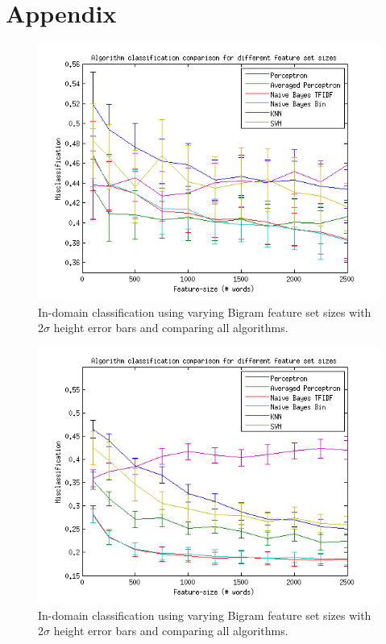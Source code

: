 \chapter{Appendix}
\begin{figure}[H]
\centering
\includegraphics[scale = 0.2]{../Plottar/feature-size100-2500bigram.png}
\caption{In-domain classification using varying Bigram feature set sizes with 2$\sigma$ height error bars and comparing all algorithms.}
\label{fig:trainingsize}
\end{figure} 




\begin{figure}[H]
\centering
\includegraphics[scale = 0.5]{../Plottar/feature-size100-2500all.png}
\caption{In-domain classification using varying Bigram feature set sizes with 2$\sigma$ height error bars and comparing all algorithms.}
\label{fig:trainingsize}
\end{figure} 

